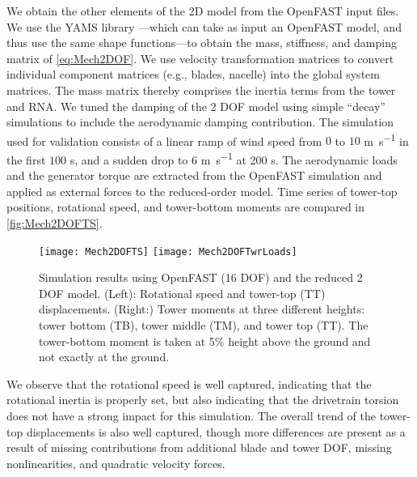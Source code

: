 \documentclass[wes, manuscript]{copernicus}
\begin{document}
We obtain the other elements of the 2D model from the OpenFAST input files.
We use the YAMS library \citep{branlard:2019flex}---which can take as input an OpenFAST model, and thus use the same shape functions---to obtain the mass, stiffness, and damping matrix of \autoref{eq:Mech2DOF}.
We use velocity transformation matrices to convert individual component matrices (e.g., blades, nacelle) into the global system matrices.
The mass matrix thereby comprises the inertia terms from the tower and RNA.
We tuned the damping of the 2 DOF model using simple ``decay'' simulations to include the aerodynamic damping contribution.
%
The simulation used for validation consists of a linear ramp of wind speed from $0$ to $10$ \unit{m~s^{-1}} in the first $100$ \unit{s}, and a sudden drop to $6$ \unit{m~s^{-1}} at 200 \unit{s}. 
The aerodynamic loads and the generator torque are extracted from the OpenFAST simulation and applied as external forces to the reduced-order model.
% 
Time series of tower-top positions, rotational speed, and tower-bottom moments are compared in \autoref{fig:Mech2DOFTS}.
%
\noindent\begin{figure}[!htb]\centering%
\hfill
  \texttt{[image: Mech2DOFTS]}
\hfill
  \texttt{[image: Mech2DOFTwrLoads]}
\hfill\ 
  \caption{Simulation results using OpenFAST (16 DOF) and the reduced 2 DOF model. (Left): Rotational speed and tower-top (TT) displacements. (Right:) Tower moments at three different heights: tower bottom (TB), tower middle (TM), and tower top (TT). The tower-bottom moment is taken at 5\% height above the ground and not exactly at the ground.}\label{fig:Mech2DOFTS}%
\end{figure}
%
We observe that the rotational speed is well captured, indicating that the rotational inertia is properly set, but also indicating that the drivetrain torsion does not have a strong impact for this simulation.
The overall trend of the tower-top displacements is also  well captured, though more differences are present as a result of missing contributions from additional blade and tower DOF, missing nonlinearities, and quadratic velocity forces. 
\end{document}
